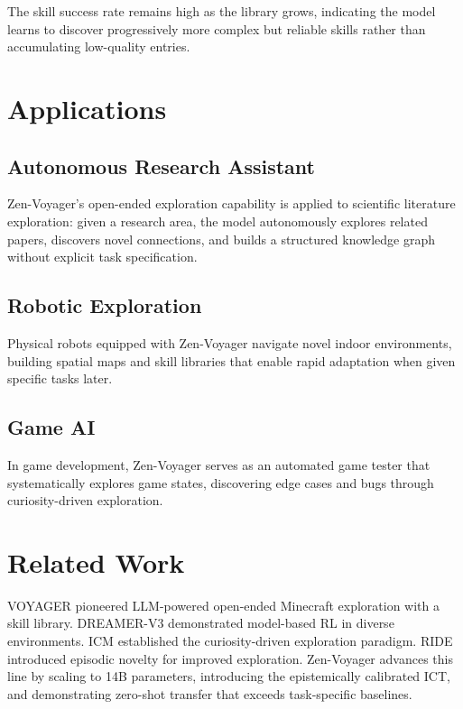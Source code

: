 \documentclass[11pt,a4paper]{article}
\begin{document}
The skill success rate remains high as the library grows, indicating the model learns to
discover progressively more complex but reliable skills rather than accumulating low-quality
entries.

\section{Applications}

\subsection{Autonomous Research Assistant}

Zen-Voyager's open-ended exploration capability is applied to scientific literature exploration:
given a research area, the model autonomously explores related papers, discovers novel
connections, and builds a structured knowledge graph without explicit task specification.

\subsection{Robotic Exploration}

Physical robots equipped with Zen-Voyager navigate novel indoor environments, building spatial
maps and skill libraries that enable rapid adaptation when given specific tasks later.

\subsection{Game AI}

In game development, Zen-Voyager serves as an automated game tester that systematically explores
game states, discovering edge cases and bugs through curiosity-driven exploration.

\section{Related Work}

VOYAGER \cite{wang2023voyager} pioneered LLM-powered open-ended Minecraft exploration with a
skill library. DREAMER-V3 \cite{hafner2023mastering} demonstrated model-based RL in diverse
environments. ICM \cite{pathak2017curiosity} established the curiosity-driven exploration
paradigm. RIDE \cite{raileanu2020ride} introduced episodic novelty for improved exploration.
Zen-Voyager advances this line by scaling to 14B parameters, introducing the epistemically
calibrated ICT, and demonstrating zero-shot transfer that exceeds task-specific baselines.
\end{document}
